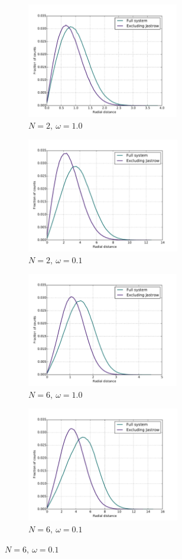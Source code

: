 \documentclass[english, a4paper]{article}
\begin{document}
\begin{figure}[H]
	
	\begin{subfigure}{0.5\textwidth}
		\includegraphics[width=\textwidth, height= 5cm]{figures/radialDistribution/radialDistributionN2w100Se7.pdf}
		\caption{$N=2,\:\omega=1.0$}
	\end{subfigure}
	\begin{subfigure}{0.5\textwidth}
		\includegraphics[width=\textwidth, height= 5cm]{figures/radialDistribution/radialDistributionN2w10Se7.pdf}
		\caption{$N=2,\:\omega=0.1$}
	\end{subfigure}
	
	\vspace{1mm}
	
	\begin{subfigure}{0.5\textwidth}
		\includegraphics[width=\textwidth, height= 5cm]{figures/radialDistribution/radialDistributionN6w100Se7.pdf}
		\caption{$N=6,\:\omega=1.0$}
	\end{subfigure}
	\begin{subfigure}{0.5\textwidth}
		\includegraphics[width=\textwidth, height= 5cm]{figures/radialDistribution/radialDistributionN6w10Se7.pdf}
		\caption{$N=6,\:\omega=0.1$}
	\end{subfigure}
	

\end{figure}
\end{document}
